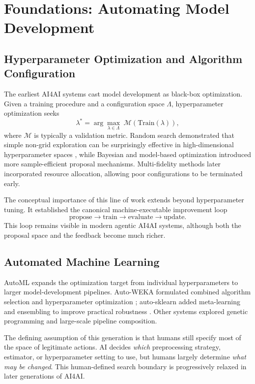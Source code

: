 \documentclass[journal]{IEEEtran}
\begin{document}
\section{Foundations: Automating Model Development}
\label{sec:foundations}

\subsection{Hyperparameter Optimization and Algorithm Configuration}
The earliest AI4AI systems cast model development as black-box optimization. Given a training procedure and a configuration space $\Lambda$, hyperparameter optimization seeks
\begin{equation}
\lambda^{*}=\arg\max_{\lambda\in\Lambda}\; \mathcal{M}(\mathrm{Train}(\lambda)),
\end{equation}
where $\mathcal{M}$ is typically a validation metric. Random search demonstrated that simple non-grid exploration can be surprisingly effective in high-dimensional hyperparameter spaces \cite{bergstra2012random}, while Bayesian and model-based optimization introduced more sample-efficient proposal mechanisms. Multi-fidelity methods later incorporated resource allocation, allowing poor configurations to be terminated early.

The conceptual importance of this line of work extends beyond hyperparameter tuning. It established the canonical machine-executable improvement loop
\begin{equation*}
\text{propose} \rightarrow \text{train} \rightarrow \text{evaluate} \rightarrow \text{update}.
\end{equation*}
This loop remains visible in modern agentic AI4AI systems, although both the proposal space and the feedback become much richer.

\subsection{Automated Machine Learning}
AutoML expands the optimization target from individual hyperparameters to larger model-development pipelines. Auto-WEKA formulated combined algorithm selection and hyperparameter optimization \cite{thornton2013autoweka}; auto-sklearn added meta-learning and ensembling to improve practical robustness \cite{feurer2015autosklearn}. Other systems explored genetic programming and large-scale pipeline composition.

The defining assumption of this generation is that humans still specify most of the space of legitimate actions. AI decides \emph{which} preprocessing strategy, estimator, or hyperparameter setting to use, but humans largely determine \emph{what may be changed}. This human-defined search boundary is progressively relaxed in later generations of AI4AI.
\end{document}
